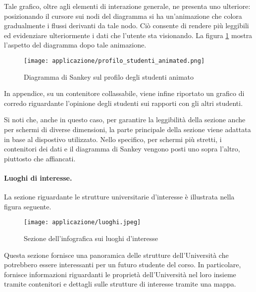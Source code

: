 Tale grafico, oltre agli elementi di interazione generale, ne presenta uno ulteriore: posizionando il cursore sui nodi del diagramma si ha un'animazione 
che colora gradualmente i flussi derivanti da tale nodo. Ciò consente di rendere più leggibili ed evidenziare ulteriormente i dati che l'utente sta visionando.
La figura \ref{fig:app_profilo_stud_animated} mostra l'aspetto del diagramma dopo tale animazione.
\begin{figure}[H] 
    \centering 
    \texttt{[image: applicazione/profilo\_studenti\_animated.png]} 
    \caption{Diagramma di Sankey sul profilo degli studenti animato}
    \label{fig:app_profilo_stud_animated}
\end{figure}

In appendice, su un contenitore collassabile, viene infine riportato un grafico di corredo riguardante l'opinione degli studenti sui rapporti con gli altri studenti.

\bigskip
\noindent Si noti che, anche in questo caso, per garantire la leggibilità della sezione anche per schermi di diverse dimensioni, la parte principale della sezione viene adattata 
in base al dispostivo utilizzato. Nello specifico, per schermi più stretti, i contenitori dei dati e il diagramma di Sankey vengono posti uno sopra l'altro, piuttosto che affiancati.

\paragraph{Luoghi di interesse.} La sezione riguardante le strutture universitarie d'interesse è illustrata nella figura seguente. 
\begin{figure}[H] 
    \centering 
    \texttt{[image: applicazione/luoghi.jpeg]} 
    \caption{Sezione dell'infografica sui luoghi d'interesse}
    \label{fig:app_luoghi}
\end{figure}
\noindent Questa sezione fornisce una panoramica delle strutture dell'Università che potrebbero essere interessanti per un futuro studente del corso.
In particolare, fornisce informazioni riguardanti le proprietà dell'Università nel loro insieme tramite contenitori e dettagli sulle strutture di interesse 
tramite una mappa. 

